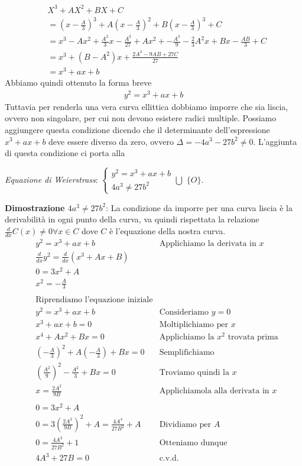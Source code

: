 \documentclass[a4paper,12pt]{tesiinfo}
\newcommand\ddfrac[2]{\frac{\displaystyle #1}{\displaystyle #2}}
\begin{document}
\begin{align*}
&X^3 + AX^2 + BX + C 
\\
&=\left(x- \ddfrac{A}{3} \right )^3 +A\left ( x - \ddfrac{A}{3} \right )^2 + B\left (x - \ddfrac{A}{3} \right )^3 +C
\\
&= x^3-Ax^2 + \ddfrac{A^2}{3}x - \ddfrac{A^3}{27} + Ax^2 + - \ddfrac{A^3}{9} -\ddfrac{2}{3}A^2x + Bx - \ddfrac{AB}{3} +C
\\
&= x^3 + (B-A^2)x + \ddfrac{2A^3-9AB+27C}{27}
\\
&= x^3 + ax+b
\end{align*}
Abbiamo quindi ottenuto la forma breve
\begin{gather}
y^2 = x^3 + ax+b
\end{gather}
Tuttavia per renderla una vera curva ellittica dobbiamo imporre che sia liscia, ovvero non singolare, per cui non devono esistere radici multiple. Possiamo aggiungere questa condizione dicendo che il determinante dell'espressione $x^3 + ax+b$ deve essere diverso da zero, ovvero $\Delta = -4a^3 - 27b^2 \ne 0$. L'aggiunta di questa condizione ci porta alla
\begin{center}
\textit{Equazione di Weierstrass}:
$\begin{cases}
y^2 = x^3 + ax+b\\
4a^3 \ne 27b^2\end{cases}
\bigcup $ $\{O\}$.\\
\end{center}
\textbf{Dimostrazione $4a^3 \ne 27b^2$}: La condizione da imporre per una curva liscia \`e la derivabilit\`a in ogni punto della curva, va quindi rispettata la relazione $\ddfrac{d}{dx}C(x) \ne 0 \forall x \in C$ dove $C$ \`e l'equazione della nostra curva.
\begin{align*}
&y^2 = x^3 + ax+b &\text{Applichiamo la derivata in $x$}\\
&\ddfrac{d}{dx}y^2 = \ddfrac{d}{dx}(x^3 +Ax+B)\\
&0 = 3x^2 +A\\
&x^2 = -\ddfrac{A}{3}\\
\\
&\text{Riprendiamo l'equazione iniziale}\\
&y^2 = x^3 + ax+b &\text{Consideriamo $y=0$}\\
&x^3 + ax+b = 0 &\text{Moltiplichiamo per $x$}\\
&x^4 + Ax^2+Bx = 0 &\text{Applichiamo la $x^2$ trovata prima}\\
&(-\ddfrac{A}{3})^2 + A(-\ddfrac{A}{3})+Bx = 0 &\text{Semplifichiamo}\\
&(\ddfrac{A^2}{9})^2 - \ddfrac{A^2}{3}+Bx = 0 &\text{Troviamo quindi la $x$}\\
&x = \ddfrac{2A^2}{9B}
&\text{Applichiamola alla derivata in $x$}\\
\\
&0 = 3x^2 +A\\
&0 = 3(\ddfrac{2A^2}{9B})^2 +A = \ddfrac{4A^4}{27B^2} +A &\text{Dividiamo per $A$}\\
&0 = \ddfrac{4A^3}{27B^2} +1 &\text{Otteniamo dunque}\\
&4A^3+27B = 0 &\text{c.v.d.}
\end{align*}
\end{document}
